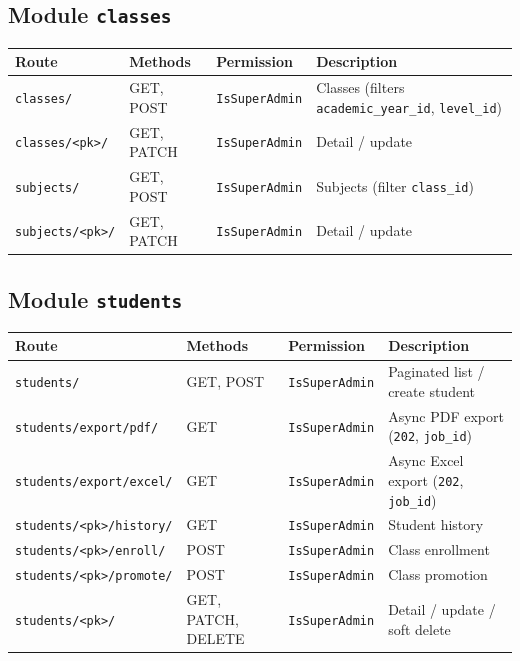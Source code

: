 \documentclass[11pt,a4paper]{article}
\begin{document}
\subsection{Module \texttt{classes}}

\begin{longtable}{@{}lllp{5.5cm}@{}}
\toprule
\textbf{Route} & \textbf{Methods} & \textbf{Permission} & \textbf{Description} \\
\midrule
\endhead
\texttt{classes/} & GET, POST & \texttt{IsSuperAdmin} & Classes (filters \texttt{academic\_year\_id}, \texttt{level\_id}) \\
\texttt{classes/<pk>/} & GET, PATCH & \texttt{IsSuperAdmin} & Detail / update \\
\texttt{subjects/} & GET, POST & \texttt{IsSuperAdmin} & Subjects (filter \texttt{class\_id}) \\
\texttt{subjects/<pk>/} & GET, PATCH & \texttt{IsSuperAdmin} & Detail / update \\
\bottomrule
\end{longtable}

\subsection{Module \texttt{students}}

\begin{longtable}{@{}lllp{5.5cm}@{}}
\toprule
\textbf{Route} & \textbf{Methods} & \textbf{Permission} & \textbf{Description} \\
\midrule
\endhead
\texttt{students/} & GET, POST & \texttt{IsSuperAdmin} & Paginated list / create student \\
\texttt{students/export/pdf/} & GET & \texttt{IsSuperAdmin} & Async PDF export (\texttt{202}, \texttt{job\_id}) \\
\texttt{students/export/excel/} & GET & \texttt{IsSuperAdmin} & Async Excel export (\texttt{202}, \texttt{job\_id}) \\
\texttt{students/<pk>/history/} & GET & \texttt{IsSuperAdmin} & Student history \\
\texttt{students/<pk>/enroll/} & POST & \texttt{IsSuperAdmin} & Class enrollment \\
\texttt{students/<pk>/promote/} & POST & \texttt{IsSuperAdmin} & Class promotion \\
\texttt{students/<pk>/} & GET, PATCH, DELETE & \texttt{IsSuperAdmin} & Detail / update / soft delete \\
\bottomrule
\end{longtable}
\end{document}
